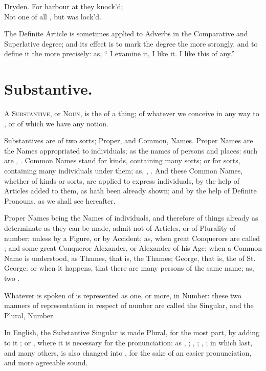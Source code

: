 \begin{aquote}{Dryden.}
  For harbour at  they knock'd;\\
  Not one of all , but was lock'd.
\end{aquote}

The Definite Article  is sometimes applied to Adverbs in the
Comparative and Superlative degree; and its effect is to mark the degree
the more strongly, and to define it the more precisely: as, `` I examine it,  I like it. I like this  of any.''

\section{Substantive.}

\textsc{A Substantive}, or \textsc{Noun}, is the  of a thing;
of whatever we conceive in any way to , or of which we have
any notion.

Substantives are of two sorts; Proper, and Common, Names. Proper Names
are the Names appropriated to individuals; as the names of persons and
places: such are , . Common Names stand for kinds,
containing many sorts; or for sorts, containing many individuals under
them; as, , . And these Common Names, whether of
kinds or sorts, are applied to express individuals, by the help of
Articles added to them, as hath been already shown; and by the help of
Definite Pronouns, as we shall see hereafter.

Proper Names being the Names of individuals, and therefore of things
already as determinate as they can be made, admit not of Articles, or of
Plurality of number; unless by a Figure, or by Accident; as, when great
Conquerors are called ; and some great Conqueror 
Alexander, or  Alexander of his Age: when a Common Name is
understood, as  Thames, that is, the  Thames; 
George, that is, the  of St. George: or when it happens, that
there are many persons of the same name; as,  two .

Whatever is spoken of is represented as one, or more, in Number: these
two manners of representation in respect of number are called the
Singular, and the Plural, Number.

In English, the Substantive Singular is made Plural, for the most part,
by adding to it ; or , where it is necessary for the
pronunciation: as , ; , ;
, ; in which last, and many others,  is also
changed into , for the sake of an easier pronunciation, and more
agreeable sound.

